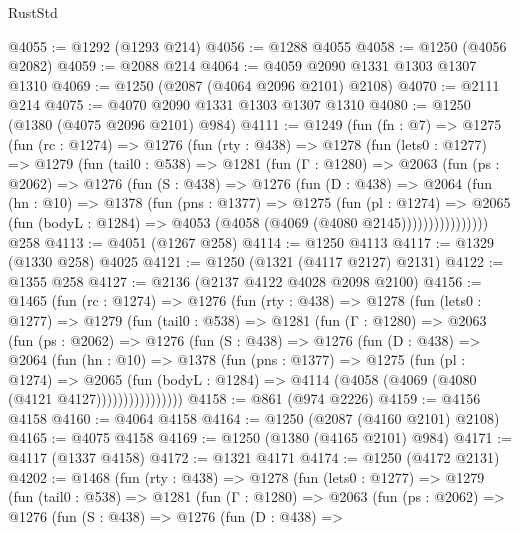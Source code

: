 \begin{lexlean}{RustStd}
\begin{coremodule}
{\begin{coremodule}
{{{{{{{{{{{{{@4055 := @1292 (@1293 @214)
@4056 := @1288 @4055
@4058 := @1250 (@4056 @2082)
@4059 := @2088 @214
@4064 := @4059 @2090 @1331 @1303 @1307 @1310
@4069 := @1250 (@2087 (@4064 @2096 @2101) @2108)
@4070 := @2111 @214
@4075 := @4070 @2090 @1331 @1303 @1307 @1310
@4080 := @1250 (@1380 (@4075 @2096 @2101) @984)
@4111 := @1249
    (fun (fn : @7) =>
    @1275
      (fun (rc : @1274) =>
      @1276
        (fun (rty : @438) =>
        @1278
          (fun (lets0 : @1277) =>
          @1279
            (fun (tail0 : @538) =>
            @1281
              (fun (Γ : @1280) =>
              @2063
                (fun (ps : @2062) =>
                @1276
                  (fun (S : @438) =>
                  @1276
                    (fun (D : @438) =>
                    @2064
                      (fun (hn : @10) =>
                      @1378
                        (fun (pns : @1377) =>
                        @1275
                          (fun (pl : @1274) =>
                          @2065
                            (fun (bodyL : @1284) => @4053 (@4058 (@4069 (@4080 @2145))))))))))))))))
    @258
@4113 := @4051 (@1267 @258)
@4114 := @1250 @4113
@4117 := @1329 (@1330 @258) @4025
@4121 := @1250 (@1321 (@4117 @2127) @2131)
@4122 := @1355 @258
@4127 := @2136 (@2137 @4122 @4028 @2098 @2100)
@4156 := @1465
    (fun (rc : @1274) =>
    @1276
      (fun (rty : @438) =>
      @1278
        (fun (lets0 : @1277) =>
        @1279
          (fun (tail0 : @538) =>
          @1281
            (fun (Γ : @1280) =>
            @2063
              (fun (ps : @2062) =>
              @1276
                (fun (S : @438) =>
                @1276
                  (fun (D : @438) =>
                  @2064
                    (fun (hn : @10) =>
                    @1378
                      (fun (pns : @1377) =>
                      @1275
                        (fun (pl : @1274) =>
                        @2065
                          (fun (bodyL : @1284) =>
                          @4114 (@4058 (@4069 (@4080 (@4121 @4127))))))))))))))))
@4158 := @861 (@974 @2226)
@4159 := @4156 @4158
@4160 := @4064 @4158
@4164 := @1250 (@2087 (@4160 @2101) @2108)
@4165 := @4075 @4158
@4169 := @1250 (@1380 (@4165 @2101) @984)
@4171 := @4117 (@1337 @4158)
@4172 := @1321 @4171
@4174 := @1250 (@4172 @2131)
@4202 := @1468
    (fun (rty : @438) =>
    @1278
      (fun (lets0 : @1277) =>
      @1279
        (fun (tail0 : @538) =>
        @1281
          (fun (Γ : @1280) =>
          @2063
            (fun (ps : @2062) =>
            @1276
              (fun (S : @438) =>
              @1276
                (fun (D : @438) =>
}}}}}}}}}}}}}
\end{coremodule}}
\end{coremodule}
\end{lexlean}
